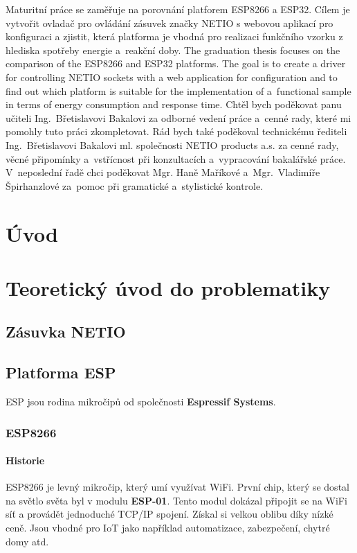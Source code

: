 \documentclass[a4paper, 12pt]{report}
\begin{document}
	\titulniStrana
	\anotace
		Maturitní práce se zaměřuje na porovnání platforem ESP8266 a ESP32. Cílem je vytvořit ovladač pro ovládání zásuvek značky NETIO s webovou aplikací pro konfiguraci a zjistit, která platforma je vhodná pro realizaci funkčního vzorku z hlediska spotřeby energie a~reakční doby.
	\annotation
		The graduation thesis focuses on the comparison of the ESP8266 and ESP32 platforms. The goal is to create a driver for controlling NETIO sockets with a web application for configuration and to find out which platform is suitable for the implementation of a~functional sample in terms of energy consumption and response time.
	\podekovani
		Chtěl bych poděkovat panu učiteli Ing.~Břetislavovi Bakalovi za odborné vedení práce a~cenné rady, které mi pomohly tuto práci zkompletovat. Rád bych také poděkoval  technickému řediteli Ing.~Břetislavovi Bakalovi ml. společnosti NETIO products a.s. za cenné rady, věcné připomínky a~vstřícnost při konzultacích a~vypracování bakalářské práce. V~neposlední řadě chci poděkovat Mgr. Haně Maříkové a~Mgr.~Vladimíře Špirhanzlové za~pomoc při gramatické a~stylistické kontrole.
	\tableofcontents

	\chapter{Úvod}
	\chapter{Teoretický úvod do problematiky}

		\section{Zásuvka NETIO}

		\section{Platforma ESP}
			ESP jsou rodina mikročipů od společnosti \textbf{Espressif Systems}.
			\subsection{ESP8266}

				\subsubsection{Historie}
					ESP8266 je levný mikročip, který umí využívat WiFi. První chip, který se dostal na světlo světa byl v modulu \textbf{ESP-01}. Tento modul dokázal připojit se na WiFi síť a provádět jednoduché TCP/IP spojení. Získal si velkou oblibu díky nízké ceně. Jsou vhodné pro IoT jako například automatizace, zabezpečení, chytré domy atd.
\end{document}
